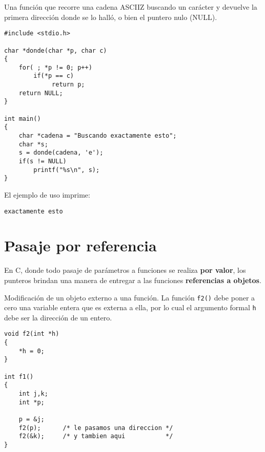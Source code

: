 \begin{ejemplo}
Una función que recorre una cadena ASCIIZ buscando un carácter y devuelve la
primera dirección donde se lo halló, o bien el puntero nulo (NULL).
\begin{lstlisting}
#include <stdio.h>

char *donde(char *p, char c)
{
    for( ; *p != 0; p++)
        if(*p == c)
             return p;
    return NULL;
}

int main()
{
    char *cadena = "Buscando exactamente esto";
    char *s;
    s = donde(cadena, 'e');
    if(s != NULL)
        printf("%s\n", s);
}
\end{lstlisting}

El ejemplo de uso imprime:
\begin{lstlisting}
exactamente esto
\end{lstlisting}
\end{ejemplo}

\section{Pasaje por referencia}
En C, donde todo pasaje de parámetros a funciones se realiza \textbf{por valor}, los punteros
brindan una manera de entregar a las funciones \textbf{referencias a objetos}. 


\begin{ejemplo}
Modificación de un objeto externo a una función.
La función \texttt{f2()} debe poner a cero una variable entera que es externa a ella, por lo cual el argumento
formal \texttt{h} debe ser la dirección de un entero.
\begin{lstlisting}
void f2(int *h)
{
    *h = 0;
}

int f1()
{
    int j,k;
    int *p;

    p = &j;
    f2(p);		/* le pasamos una direccion */
    f2(&k);		/* y tambien aqui           */
}
\end{lstlisting}
\end{ejemplo}


